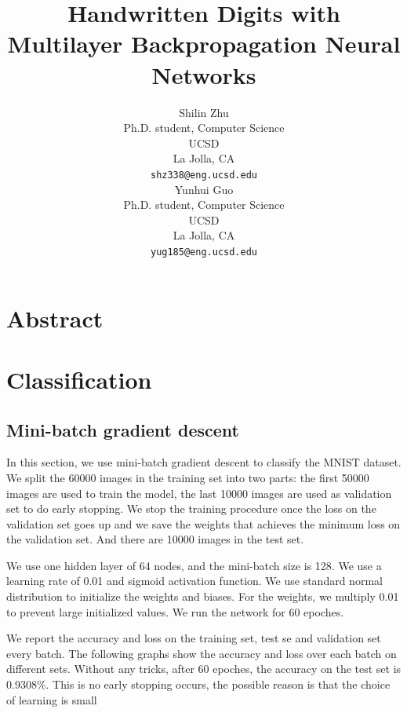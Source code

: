 \documentclass{article} %
\title{Handwritten Digits with Multilayer Backpropagation Neural Networks}
\author{
Shilin Zhu \\
Ph.D. student, Computer Science\\
UCSD\\
La Jolla, CA \\
\texttt{shz338@eng.ucsd.edu} \\
\And
Yunhui Guo\\
Ph.D. student, Computer Science\\
UCSD\\
La Jolla, CA \\
\texttt{yug185@eng.ucsd.edu} \\
}
\begin{document}
\maketitle
\section{Abstract}

\section{Classification}
\subsection{Mini-batch gradient descent}
In this section, we use mini-batch gradient descent to classify the MNIST dataset. We split the 60000 images in the training set into two parts: the first 50000 images are used to train the model, the last 10000 images are used as validation set to do early stopping. We stop the training procedure once the loss on the validation set goes up and we save the weights that achieves the minimum loss on the validation set. And there are 10000 images in the test set.

We use one hidden layer of 64 nodes, and the mini-batch size is 128. We use a learning rate of 0.01 and sigmoid activation function. We use standard normal distribution to initialize the weights and biases. For the weights, we multiply 0.01 to prevent large initialized values. We run the network for 60 epoches.

 We report the accuracy and loss on the training set, test se and validation set every batch. The following graphs show the accuracy and loss over each batch on different sets. Without any tricks, after 60 epoches, the accuracy on the test set is 0.9308\%. This is no early stopping occurs, the possible reason is that the choice of learning is small
\end{document}
